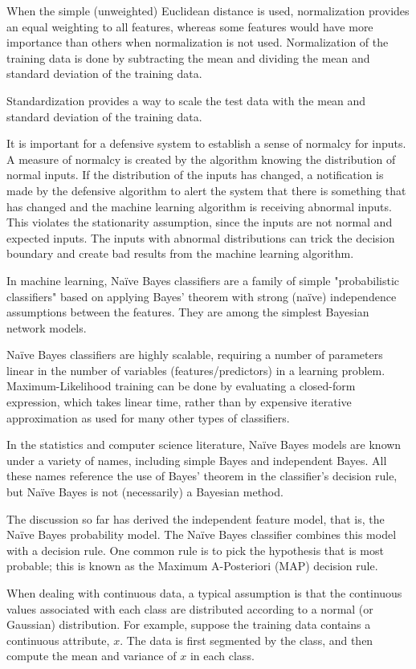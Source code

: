 \documentclass[conference]{IEEEtran}
\begin{document}
When the simple (unweighted) Euclidean distance is used, normalization provides an equal weighting to all features, whereas some features would have more importance than others when normalization is not used. Normalization of the training data is done by subtracting the mean and dividing the mean and standard deviation of the training data. 

Standardization provides a way to scale the test data with the mean and standard deviation of the training data. 

It is important for a defensive system to establish a sense of normalcy for inputs. A measure of normalcy is created by the algorithm knowing the distribution of normal inputs. If the distribution of the inputs has changed, a notification is made by the defensive algorithm to alert the system that there is something that has changed and the machine learning algorithm is receiving abnormal inputs. This violates the stationarity assumption, since the inputs are not normal and expected inputs. The inputs with abnormal distributions can trick the decision boundary and create bad results from the machine learning algorithm. 

In machine learning, Naïve Bayes classifiers are a family of simple "probabilistic classifiers" based on applying Bayes' theorem with strong (naïve) independence assumptions between the features. They are among the simplest Bayesian network models.

Naïve Bayes classifiers are highly scalable, requiring a number of parameters linear in the number of variables (features/predictors) in a learning problem. Maximum-Likelihood training can be done by evaluating a closed-form expression, which takes linear time, rather than by expensive iterative approximation as used for many other types of classifiers.

In the statistics and computer science literature, Naïve Bayes models are known under a variety of names, including simple Bayes and independent Bayes. All these names reference the use of Bayes' theorem in the classifier's decision rule, but Naïve Bayes is not (necessarily) a Bayesian method. 

The discussion so far has derived the independent feature model, that is, the Naïve Bayes probability model. The Naïve Bayes classifier combines this model with a decision rule. One common rule is to pick the hypothesis that is most probable; this is known as the Maximum A-Posteriori (MAP) decision rule. 

When dealing with continuous data, a typical assumption is that the continuous values associated with each class are distributed according to a normal (or Gaussian) distribution. For example, suppose the training data contains a continuous attribute, \begin{math}x\end{math}. The data is first segmented by the class, and then compute the mean and variance of \begin{math}x\end{math} in each class.
\end{document}
